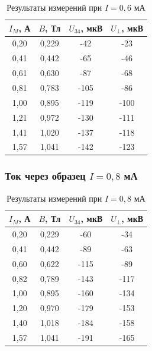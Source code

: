 \documentclass[12pt,a4paper]{article}
\begin{document}
\begin{table}[H]
\centering
\caption{Результаты измерений при $I=0{,}6$ мА}
\label{tab:hall06}
\begin{tabular}{@{}cccc@{}}
\toprule
$I_M$, А & $B$, Тл & $U_{34}$, мкВ & $U_\perp$, мкВ \\
\midrule
0{,}20 & 0{,}229 & -42 & -23 \\
0{,}41 & 0{,}442 & -65 & -46 \\
0{,}61 & 0{,}630 & -87 & -68 \\
0{,}81 & 0{,}783 & -105 & -86 \\
1{,}00 & 0{,}895 & -119 & -100 \\
1{,}21 & 0{,}972 & -130 & -111 \\
1{,}41 & 1{,}020 & -137 & -118 \\
1{,}57 & 1{,}041 & -142 & -123 \\
\bottomrule
\end{tabular}
\end{table}
\subsubsection*{Ток через образец $I=0{,}8$ мА}
\begin{table}[H]
\centering
\caption{Результаты измерений при $I=0{,}8$ мА}
\label{tab:hall08}
\begin{tabular}{@{}cccc@{}}
\toprule
$I_M$, А & $B$, Тл & $U_{34}$, мкВ & $U_\perp$, мкВ \\
\midrule
0{,}20 & 0{,}229 & -60 & -34 \\
0{,}41 & 0{,}442 & -89 & -63 \\
0{,}60 & 0{,}622 & -115 & -89 \\
0{,}82 & 0{,}789 & -143 & -117 \\
1{,}00 & 0{,}895 & -160 & -134 \\
1{,}20 & 0{,}970 & -179 & -153 \\
1{,}40 & 1{,}018 & -184 & -158 \\
1{,}57 & 1{,}041 & -191 & -165 \\
\bottomrule
\end{tabular}
\end{table}
\end{document}
